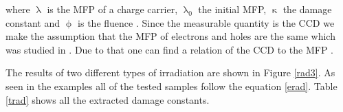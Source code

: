 \noindent
where $\uplambda$ is the \ac{MFP} of a charge carrier, $\uplambda_0$ the initial \ac{MFP}, $\upkappa$ the damage constant and $\upphi$ is the fluence \cite{felix}. Since the measurable quantity is the \ac{CCD} we make the assumption that the \ac{MFP} of electrons and holes are the same which was studied in \cite{felix}. Due to that one can find a relation of the \ac{CCD} to the \ac{MFP} .\par
The results of two different types of irradiation are shown in Figure \ref{rad3}. As seen in the examples all of the tested samples follow the equation \ref{erad}. Table \ref{trad} shows all the extracted damage constants.


